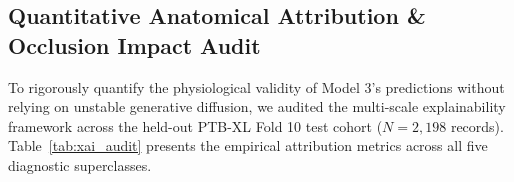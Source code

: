 \documentclass[12pt]{elsarticle}
\begin{document}
\begin{table}[t]
\caption{10-Fold Stratified Cross-Validation Benchmark Results on PTB-XL. Mean $\pm$ Std [95\% CI] across 10 cyclic folds.}
\label{tab:10fold_results}
\centering
\small
\setlength{\tabcolsep}{4.5pt}
\end{table}

\subsection{Quantitative Anatomical Attribution \& Occlusion Impact Audit}
To rigorously quantify the physiological validity of Model 3's predictions without relying on unstable generative diffusion, we audited the multi-scale explainability framework across the held-out PTB-XL Fold 10 test cohort ($N = 2,198$ records). Table~\ref{tab:xai_audit} presents the empirical attribution metrics across all five diagnostic superclasses.
\end{document}
